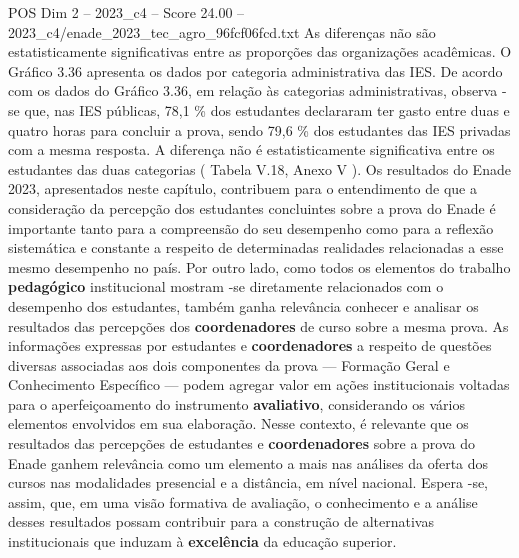 \begin{textsample}{POS Dim 2 – 2023\_c4 – Score 24.00 – 2023\_c4/enade\_2023\_tec\_agro\_96fcf06fcd.txt}
As diferenças não são estatisticamente significativas entre as proporções das organizações acadêmicas.
O Gráfico 3.36 apresenta os dados por categoria administrativa das IES.
De acordo com os dados do Gráfico 3.36, em relação às categorias administrativas, observa -se que, nas IES públicas, 78,1 \% dos estudantes declararam ter gasto entre duas e quatro horas para concluir a prova, sendo 79,6 \% dos estudantes das IES privadas com a mesma resposta.
A diferença não é estatisticamente significativa entre os estudantes das duas categorias ( Tabela V.18, Anexo V ).
Os resultados do Enade 2023, apresentados neste capítulo, contribuem para o entendimento de que a consideração da percepção dos estudantes concluintes sobre a prova do Enade é importante tanto para a compreensão do seu desempenho como para a reflexão sistemática e constante a respeito de determinadas realidades relacionadas a esse mesmo desempenho no país.
Por outro lado, como todos os elementos do trabalho \textbf{pedagógico} institucional mostram -se diretamente relacionados com o desempenho dos estudantes, também ganha relevância conhecer e analisar os resultados das percepções dos \textbf{coordenadores} de curso sobre a mesma prova.
As informações expressas por estudantes e \textbf{coordenadores} a respeito de questões diversas associadas aos dois componentes da prova — Formação Geral e Conhecimento Específico — podem agregar valor em ações institucionais voltadas para o aperfeiçoamento do instrumento \textbf{avaliativo}, considerando os vários elementos envolvidos em sua elaboração.
Nesse contexto, é relevante que os resultados das percepções de estudantes e \textbf{coordenadores} sobre a prova do Enade ganhem relevância como um elemento a mais nas análises da oferta dos cursos nas modalidades presencial e a distância, em nível nacional.
Espera -se, assim, que, em uma visão formativa de avaliação, o conhecimento e a análise desses resultados possam contribuir para a construção de alternativas institucionais que induzam à \textbf{excelência} da educação superior.

\end{textsample}
